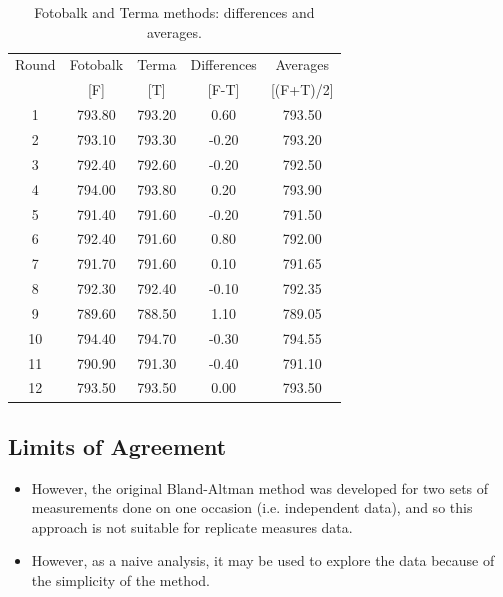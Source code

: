 \documentclass[compress]{beamer}        %
\begin{document}
\begin{frame}
\begin{table}[h!]

\begin{center}
\begin{tabular}{|c||c|c||c|c|}
  \hline
 Round & Fotobalk  & Terma  & Differences  & Averages  \\
  &  [F] & [T] & [F-T] &  [(F+T)/2] \\
  \hline
1 & 793.80 & 793.20 & 0.60 & 793.50 \\
  2 & 793.10 & 793.30 & -0.20 & 793.20 \\
  3 & 792.40 & 792.60 & -0.20 & 792.50 \\
  4 & 794.00 & 793.80 & 0.20 & 793.90 \\
  5 & 791.40 & 791.60 & -0.20 & 791.50 \\
  6 & 792.40 & 791.60 & 0.80 & 792.00 \\
  7 & 791.70 & 791.60 & 0.10 & 791.65 \\
  8 & 792.30 & 792.40 & -0.10 & 792.35 \\
  9 & 789.60 & 788.50 & 1.10 & 789.05 \\
  10 & 794.40 & 794.70 & -0.30 & 794.55 \\
  11 & 790.90 & 791.30 & -0.40 & 791.10 \\
  12 & 793.50 & 793.50 & 0.00 & 793.50 \\

   \hline
\end{tabular}
\caption{Fotobalk and Terma methods: differences and averages.}
\end{center}
\end{table}
\end{frame}
\subsection{Limits of Agreement}
\begin{frame}
\begin{itemize}
\item  However, the original Bland-Altman method was developed for two sets of measurements done on one occasion (i.e. independent data), and so this approach is not suitable for replicate measures data.
\item However, as a naive analysis, it may be used to explore the data because of the simplicity of the method.
\end{itemize}
\end{frame}
\end{document}

